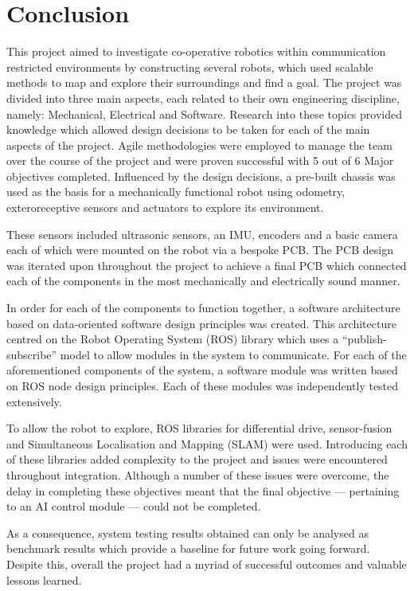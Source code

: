 
\chapter{Conclusion}\label{conclusion}
This project aimed to investigate co-operative robotics within 
communication restricted environments by constructing several robots, 
which used scalable methods to map and explore their surroundings and find 
a goal. The project was divided into three main aspects, each related to 
their own engineering discipline, namely: Mechanical, Electrical and 
Software. Research into these topics provided knowledge which allowed 
design decisions to be taken for each of the main aspects of the project. 
Agile methodologies were employed to manage the team over the course of 
the project and were proven successful with 5 out of 6 Major objectives 
completed. Influenced by the design decisions, a pre-built chassis was 
used as the basis for a mechanically functional robot using odometry, 
exteroreceptive sensors and actuators to explore its environment. 

These sensors included ultrasonic sensors, an IMU, encoders and a basic 
camera each of which were mounted on the robot via a bespoke PCB. The PCB 
design was iterated upon throughout the project to achieve a final PCB 
which connected each of the components in the most mechanically and 
electrically sound manner. 

In order for each of the components to function together, a software 
architecture based on data-oriented software design principles was 
created. This architecture centred on the Robot Operating System (ROS) 
library which uses a ``publish-subscribe'' model to allow modules in the 
system to communicate. For each of the aforementioned components of the 
system, a software module was written based on ROS node design principles. 
Each of these modules was independently tested extensively. 

To allow the robot to explore, ROS libraries for differential drive, 
sensor-fusion and Simultaneous Localisation and Mapping (SLAM) were used. 
Introducing each of these libraries added complexity to the project and 
issues were encountered throughout integration. Although a number of these 
issues were overcome, the delay in completing these objectives meant that 
the final objective --- pertaining to an AI control module --- could not 
be completed. 

As a consequence, system testing results obtained can only be analysed as 
benchmark results which provide a baseline for future work going forward. 
Despite this, overall the project had a myriad of successful outcomes and 
valuable lessons learned.      

